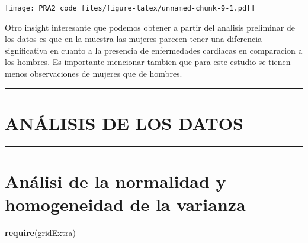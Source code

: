 \documentclass[
]{article}
\newenvironment{Shaded}{\begin{snugshade}}{\end{snugshade}}
\newcommand{\DataTypeTok}[1]{\textcolor[rgb]{0.13,0.29,0.53}{#1}}
\newcommand{\KeywordTok}[1]{\textcolor[rgb]{0.13,0.29,0.53}{\textbf{#1}}}
\newcommand{\NormalTok}[1]{#1}
\newcommand{\OperatorTok}[1]{\textcolor[rgb]{0.81,0.36,0.00}{\textbf{#1}}}
\newcommand{\StringTok}[1]{\textcolor[rgb]{0.31,0.60,0.02}{#1}}
\begin{document}
\begin{Shaded}
\end{Shaded}

\texttt{[image: PRA2\_code\_files/figure-latex/unnamed-chunk-9-1.pdf]}

Otro insight interesante que podemos obtener a partir del analisis
preliminar de los datos es que en la muestra las mujeres parecen tener
una diferencia significativa en cuanto a la presencia de enfermedades
cardiacas en comparacion a los hombres. Es importante mencionar tambien
que para este estudio se tienen menos observaciones de mujeres que de
hombres.

\begin{center}\rule{0.5\linewidth}{0.5pt}\end{center}

\hypertarget{anuxe1lisis-de-los-datos}{%
\section{ANÁLISIS DE LOS DATOS}\label{anuxe1lisis-de-los-datos}}

\begin{center}\rule{0.5\linewidth}{0.5pt}\end{center}

\hypertarget{anuxe1lisi-de-la-normalidad-y-homogeneidad-de-la-varianza}{%
\section{Análisi de la normalidad y homogeneidad de la
varianza}\label{anuxe1lisi-de-la-normalidad-y-homogeneidad-de-la-varianza}}

\begin{Shaded}
\begin{Highlighting}[]
\KeywordTok{require}\NormalTok{(gridExtra)}
\end{Highlighting}
\end{Shaded}
\end{document}

